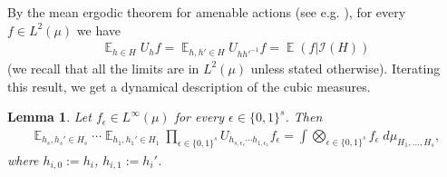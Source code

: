 \documentclass[11pt]{amsart}
\newtheorem{lemma}{Lemma}[section]
\theoremstyle{definition}
\DeclareMathOperator*{\E}{\mathbb{E}}
\newcommand{\CI}{{\mathcal I}}
\newcommand{\eps}{\epsilon}
\newcommand{\inv}{^{-1}}
\newcommand{\1}{{\mathbf{1}}}
\begin{document}
By the mean ergodic theorem for amenable actions (see e.g. \cite[Theorem~3.33]{Glasner}), for every $f\in L^2(\mu)$ we have
\begin{align*}
    \E_{h\in H}U_h f = \E_{h,h'\in H}U_{h{h'}\inv} f = \E(f|\CI(H))
\end{align*}
{(we recall that all the limits are in $L^2(\mu)$ unless stated otherwise).}
Iterating this result, we get a dynamical description of the cubic measures.
\begin{lemma}\label{L: cubic measures using averages}
Let $f_\eps\in L^\infty(\mu)$ for every $\eps\in{\{0,1\}^s}$. Then 
    \begin{align*}
        \E_{h_s,h_s'\in H_s}\cdots \E_{h_1,h_1'\in H_1}\prod_{\eps\in\{0,1\}^s}U_{h_{s,\eps_s}\cdots h_{1,\eps_1}}f_\eps = \int \bigotimes_{\eps\in\{0,1\}^s}f_\eps\; d\mu_{H_1, \ldots, H_s},
    \end{align*}
    where $h_{i,0} := h_i$, $h_{i,1}:=h_i'$.
\end{lemma}
\end{document}
